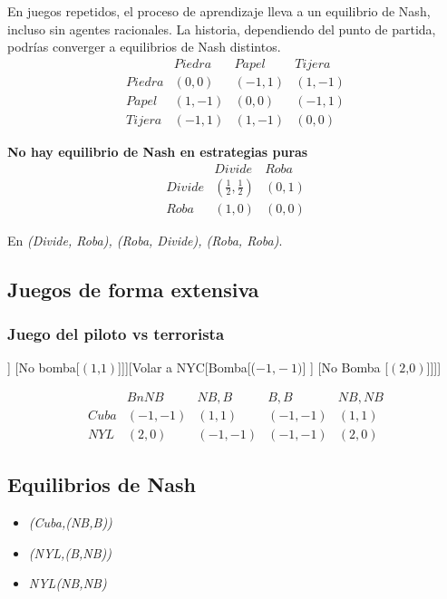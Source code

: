 \documentclass[letterpaper,12pt,twocolumn]{report}
\begin{document}
En juegos repetidos, el proceso de aprendizaje lleva a un equilibrio de Nash, incluso sin agentes racionales. La historia, dependiendo del punto de partida, podrías converger a equilibrios de Nash distintos.
$$
\begin{matrix}
  &	Piedra & Papel & Tijera \\
  Piedra & (0,0) & (-1,1) & (1,-1) \\
  Papel & (1,-1) & (0,0) & (-1,1) \\
  Tijera & (-1,1) & (1,-1) & (0,0)
\end{matrix}
$$

\textbf{No hay equilibrio de Nash en estrategias puras}
$$
\begin{matrix}
	&	Divide & Roba \\
	Divide & (\frac{1}{2},\frac{1}{2}) & (0,1) \\
	Roba & (1,0) & (0,0)
\end{matrix}
$$

En \textit{(Divide, Roba), (Roba, Divide), (Roba, Roba)}.

\subsection*{Juegos de forma extensiva}
\subsubsection*{Juego del piloto vs terrorista}


\begin{forest}
	[El piloto mueve [Volar a cuba [Bomba [$(1\text{,}-1)$] ] [No bomba[$(1\text{,}1)$]]][Volar a NYC[Bomba[($-1\text{,}-1)$] ] [No Bomba [$(2\text{,}0)$]]]]
\end{forest}


$$
\begin{matrix}
	& BnNB & NB,B & B,B & NB,NB \\
	Cuba & (-1,-1) & (1,1) & (-1,-1) & (1,1)\\
	NYL & (2,0) & (-1,-1) & (-1,-1) & (2,0)
\end{matrix}
$$

\subsection*{Equilibrios de Nash}

\begin{itemize}
	
	\item \textit{(Cuba,(NB,B))}
	\item \textit{(NYL,(B,NB))}
	\item \textit{NYL(NB,NB)}
\end{itemize}
\end{document}
